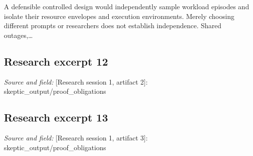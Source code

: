 \documentclass[11pt]{article}
\begin{document}
A defensible controlled design would independently sample workload episodes and isolate their resource envelopes and execution environments. Merely choosing different prompts or researchers does not establish independence. Shared outages,\ldots{}

\subsection{Research excerpt 12}
\textit{Source and field: }[Research session 1, artifact 2]: skeptic\_output/proof\_obligations\par
["Established analytically, agent-reviewed only: the conditional federation threshold and completion-ceiling corollary \textemdash{} cycle 1, current Investigator step de6fe0d9-9414-403f-8c1f-4832ea3e5e5a, reasoning step 6.", "Established analytically within its stated range: the success-adjusted local/API crossover \textemdash{} cycle 1, the same Investigator step, reasoning step 5.", "Established by hand arithmetic as a synthetic example only: greater useful throughput need not lower unit cost \textemdash{} cycle 1, the same Investigator step, reasoning step 7.", "Established conditionally, not operationally: the reservation accounting invariant \textemdash{} cycle 1, the same Investigator step, reasoning step 8; implementation and contract premises remain o18.", "Overall completion still requires o15\textendash{}o21 and an explicit four-baseline cost/coverage sensitivity worksheet; the proposed architecture also needs concrete enforcement transitions."]

\subsection{Research excerpt 13}
\textit{Source and field: }[Research session 1, artifact 3]: skeptic\_output/proof\_obligations\par
["Conditional allocation invariant: supported by cycle 1, Investigator step 0d553ed5-938d-411e-a747-977e366fcaf0, reasoning steps 3\textendash{}4; convincing but unverified.", "Necessity of retaining unresolved reservations: supported by the hypothetical counterexample in cycle 1, reasoning step 5.", "Limits of fair-share scheduling alone: supported by the constructed blocking, incompatibility and strict-priority examples in cycle 1, reasoning step 7.", "Instantiation of accounting and policy assumptions: open; requires contractual evidence and implementation fault tests.", "Decision-ready pilot and empirical usefulness, reliability, cost and federation benefit: open."]
\end{document}
